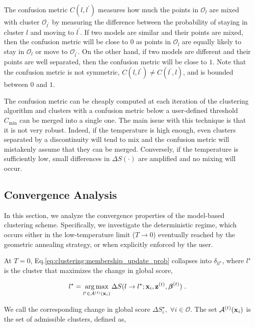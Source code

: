 The confusion metric $C(l,l^{\prime})$ measures how much the points in $\mathcal{O}_l$ are mixed with cluster $\mathcal{O}_{l^\prime}$ by measuring the difference between the probability of staying in cluster $l$ and moving to $l^\prime$. If two models are similar and their points are mixed, then the confusion metric will be close to $0$ as points in $\mathcal{O}_l$ are equally likely to stay in $\mathcal{O}_l$ or move to $\mathcal{O}_{l^\prime}$. On the other hand, if two models are different and their points are well separated, then the confusion metric will be close to $1$. Note that the confusion metric is not symmetric, $C(l,l^{\prime}) \neq C(l^{\prime},l)$, and is bounded between $0$ and $1$. 

\smallskip
The confusion metric can be cheaply computed at each iteration of the clustering algorithm and clusters with a confusion metric below a user-defined threshold $C_{\min}$ can be merged into a single one. The main issue with this technique is that it is not very robust. Indeed, if the temperature is high enough, even clusters separated by a discontinuity will tend to mix and the confusion metric will mistakenly assume that they can be merged. Conversely, if the temperature is sufficiently low, small differences in $\Delta S (\cdot)$ are amplified and no mixing will occur.

\subsection{Convergence Analysis}
\label{sc:convergence}

In this section, we analyze the convergence properties of the model-based clustering scheme. Specifically, we investigate the deterministic regime, which occurs either in the low-temperature limit ($T \rightarrow 0$) eventually reached by the geometric annealing strategy, or when explicitly enforced by the user. 

\smallskip
At $T=0$, Eq.\eqref{eq:clustering:membership_update_prob} collapses into $\delta_{l l^\star}$, where $l^\star$ is the cluster that maximizes the change in global score,

\begin{equation}
  l^\star = \operatorname*{arg\,max}_{l^\prime \in \mathcal{A}^{(t)}(\mathbf{x}_i)} \Delta S (l \rightarrow l^\star; \mathbf{x}_i, \mathbf{z}^{(t)}, \boldsymbol{\beta}^{(t)})\;.
\end{equation}

We call the corresponding change in global score $\Delta S_i ^\star,\; \forall i \in \mathcal{O}$. The set $\mathcal{A}^{(t)}(\mathbf{x}_i)$ is the set of admissible clusters, defined as,

